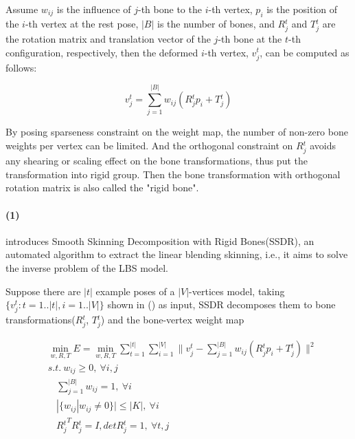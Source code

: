 Assume
$w_{ij}$ is the influence of $j$-th bone to the $i$-th vertex,
$p_{i}$ is the position of the $i$-th vertex at the rest pose,
$|B|$ is the number of bones, and
$R{_{j}^{t}}$ and $T{_{j}^{t}}$ are the rotation matrix and translation vector of the $j$-th bone at the $t$-th configuration, respectively,
then the deformed $i$-th vertex, $v{_{j}^{t}}$, can be computed as follows:

\small{
\begin{equation}
 \label{eq:LBS}
 v{_{j}^{t}}=\sum_{j=1}^{|B|}w_{ij}(R{_{j}^{t}}p_{i}+T{_{j}^{t}})
\end{equation}
}

By posing sparseness constraint on the weight map, the number of non-zero bone weights per vertex can be limited.
And the orthogonal constraint on $R{_{j}^{t}}$ avoids any shearing or scaling effect on the bone transformations,
thus put the transformation into rigid group.
Then the bone transformation with orthogonal rotation matrix is also called the "rigid bone".


\paragraph{(1)}
\cite{le2012smooth} introduces Smooth Skinning Decomposition with Rigid Bones(SSDR), an automated algorithm to extract the linear blending skinning, i.e., it aims to solve the inverse problem of the LBS model.

Suppose there are $|t|$ example poses of a $|V|$-vertices model, taking $\{v{_{j}^{t}}: t=1..|t|,i=1..|V|\}$ shown in () as input, SSDR decomposes them to bone transformations($R{_{j}^{t}}$, $T{_{j}^{t}}$) and the bone-vertex weight map

\small{
\begin{equation}
 \label{eq:SSDR}
 \begin{split}
 & \min_{w,R,T}E=\min_{w,R,T}\sum_{t=1}^{|t|}\sum_{i=1}^{|V|}\|v{_{j}^{t}}-\sum_{j=1}^{|B|}w_{ij}(R{_{j}^{t}}p_{i}+T{_{j}^{t}})\|^2 \\
 & s.t.~w_{ij}\ge0,~\forall i,j\\
 & ~~~~\sum_{j=1}^{|B|}w_{ij}=1,~\forall i\\
 & ~~~~|\{w_{ij}|w_{ij}\neq0\}|\le|K|,~\forall i \\
 & ~~~~{R{_{j}^{t}}}^{T}R{_{j}^{t}}=I,detR{_{j}^{t}}=1,~\forall t,j
 \end{split}
\end{equation}
}

